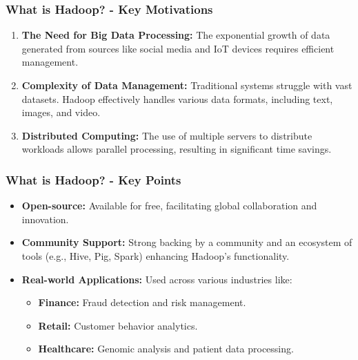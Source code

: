 \documentclass[aspectratio=169]{beamer}
\begin{document}
\begin{frame}[fragile]
    \frametitle{What is Hadoop? - Key Motivations}
    \begin{enumerate}
        \item \textbf{The Need for Big Data Processing:} The exponential growth of data generated from sources like social media and IoT devices requires efficient management.
        \item \textbf{Complexity of Data Management:} Traditional systems struggle with vast datasets. Hadoop effectively handles various data formats, including text, images, and video.
        \item \textbf{Distributed Computing:} The use of multiple servers to distribute workloads allows parallel processing, resulting in significant time savings.
    \end{enumerate}
\end{frame}

\begin{frame}[fragile]
    \frametitle{What is Hadoop? - Key Points}
    \begin{itemize}
        \item \textbf{Open-source:} Available for free, facilitating global collaboration and innovation.
        \item \textbf{Community Support:} Strong backing by a community and an ecosystem of tools (e.g., Hive, Pig, Spark) enhancing Hadoop's functionality.
        \item \textbf{Real-world Applications:} Used across various industries like:
            \begin{itemize}
                \item \textbf{Finance:} Fraud detection and risk management.
                \item \textbf{Retail:} Customer behavior analytics.
                \item \textbf{Healthcare:} Genomic analysis and patient data processing.
            \end{itemize}
    \end{itemize}
\end{frame}
\end{document}
